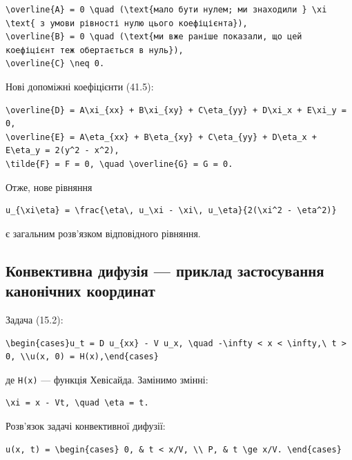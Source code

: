 \documentclass[
  ukrainian,
]{article}
\begin{document}
\begin{verbatim}
\overline{A} = 0 \quad (\text{мало бути нулем; ми знаходили } \xi \text{ з умови рівності нулю цього коефіцієнта}),
\overline{B} = 0 \quad (\text{ми вже раніше показали, що цей коефіцієнт теж обертається в нуль}),
\overline{C} \neq 0.
\end{verbatim}

Нові допоміжні коефіцієнти (41.5):

\begin{verbatim}
\overline{D} = A\xi_{xx} + B\xi_{xy} + C\eta_{yy} + D\xi_x + E\xi_y = 0,
\overline{E} = A\eta_{xx} + B\eta_{xy} + C\eta_{yy} + D\eta_x + E\eta_y = 2(y^2 - x^2),
\tilde{F} = F = 0, \quad \overline{G} = G = 0.
\end{verbatim}

Отже, нове рівняння

\begin{verbatim}
u_{\xi\eta} = \frac{\eta\, u_\xi - \xi\, u_\eta}{2(\xi^2 - \eta^2)}
\end{verbatim}

є загальним розв'язком відповідного рівняння.

\subsection{Конвективна дифузія --- приклад застосування канонічних
координат}\label{ux43aux43eux43dux432ux435ux43aux442ux438ux432ux43dux430-ux434ux438ux444ux443ux437ux456ux44f-ux43fux440ux438ux43aux43bux430ux434-ux437ux430ux441ux442ux43eux441ux443ux432ux430ux43dux43dux44f-ux43aux430ux43dux43eux43dux456ux447ux43dux438ux445-ux43aux43eux43eux440ux434ux438ux43dux430ux442}

Задача (15.2):

\begin{verbatim}
\begin{cases}u_t = D u_{xx} - V u_x, \quad -\infty < x < \infty,\ t > 0, \\u(x, 0) = H(x),\end{cases}
\end{verbatim}

де \texttt{H(x)} --- функція Хевісайда. Замінимо змінні:

\begin{verbatim}
\xi = x - Vt, \quad \eta = t.
\end{verbatim}

Розв'язок задачі конвективної дифузії:

\begin{verbatim}
u(x, t) = \begin{cases} 0, & t < x/V, \\ P, & t \ge x/V. \end{cases}
\end{verbatim}
\end{document}
